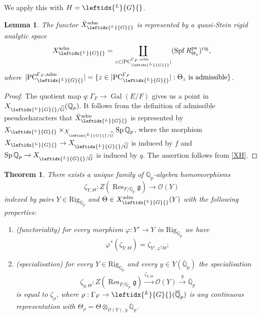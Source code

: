 \documentclass{amsart}
\newtheorem{lem}[prop]{Lemma}
\newtheorem{thm}[prop]{Theorem}
\theoremstyle{definition}
\theoremstyle{remark}
\DeclareMathOperator{\Res}{Res}
\DeclareMathOperator{\Gal}{Gal}
\DeclareMathOperator{\Sp}{Sp}
\newcommand{\Qp}{\mathbb {Q}_p}
\newcommand{\Qpbar}{\overline{\mathbb{Q}}_p}
\newcommand{\OO}{\mathcal O}
\newcommand{\adm}{\mathrm{adm}}
\DeclareMathOperator{\Spf}{Spf}
\newcommand{\rig}{\mathrm{rig}}
\newcommand{\PC}{\mathrm{PC}}
\newcommand{\ps}{\mathrm{ps}}
\newcommand{\Ghat}{\widehat{G}}
\newcommand{\LG}{\leftidx{^L}{G}{}}
\newcommand{\Rig}{\mathrm{Rig}}
\begin{document}
We apply this with $H=\LG$. 
\begin{lem} The functor 
$\tilde{X}^{\adm}_{\LG}$ is represented by  a quasi-Stein rigid analytic space
\begin{equation}\label{admLG}
X^{\adm}_{\LG}= \coprod_{z\in |\PC^{\Gamma_F,\adm}_{\LG}|} (\Spf R^{\ps}_{\Theta_z})^{\rig},
\end{equation}
where $|\PC^{\Gamma_F,\adm}_{\LG}|=\{z\in |\PC^{\Gamma_F}_{\LG}|:  \Theta_z \text{ is  admissible}\}$. \end{lem}
\begin{proof} The quotient map $q:\Gamma_F \rightarrow \Gal(E/F)$ 
gives us a point in $X_{\LG/\Ghat}(\Qp)$. It follows 
from the definition of admissible pseudocharacters  that $\tilde{X}^{\adm}_{\LG}$ is represented by $X_{\LG}\times_{X_{\LG/\Ghat}} \Sp \Qp$, where the morphism 
$X_{\LG}\rightarrow X_{\LG/\Ghat}$ is induced by $f$ and $\Sp \Qp \rightarrow X_{\LG/\Ghat}$ is induced by $q$. The assertion follows from \eqref{XH}.
\end{proof}

\begin{thm}\label{main_L} There exists a unique  family of $\Qp$-algebra 
homomorphisms $$\zeta_{Y,\Theta}: Z(\Res_{F/\Qp} \mathfrak g)\rightarrow \OO(Y)$$ indexed by pairs $Y\in \Rig_{\Qp}$ and 
$\Theta\in X^{\adm}_{\LG}(Y)$ with the following properties:
\begin{enumerate} 
\item (functoriality) for every morphism $\varphi: Y'\rightarrow Y$ in $\Rig_{\Qp}$ we have $$\varphi^*(\zeta_{Y, \Theta})= \zeta_{Y', \varphi^* \Theta};$$
\item (specialisation) for every $Y\in \Rig_{\Qp}$ and every 
$y\in Y(\Qpbar)$ the specialisation 
$$\zeta_{y, \Theta}:  Z(\Res_{F/\Qp} \mathfrak g)
\overset{\zeta_{Y,\Theta}}{\longrightarrow} \OO(Y)\overset{y}{\longrightarrow} \Qpbar$$
is equal to $\zeta_{\rho}$, where $\rho: \Gamma_F \rightarrow 
\LG(\Qpbar)$ is any continuous representation with 
$\Theta_{\rho}= \Theta\otimes_{\OO(Y), y} \Qpbar$. 
\end{enumerate}
\end{thm}
\end{document}
